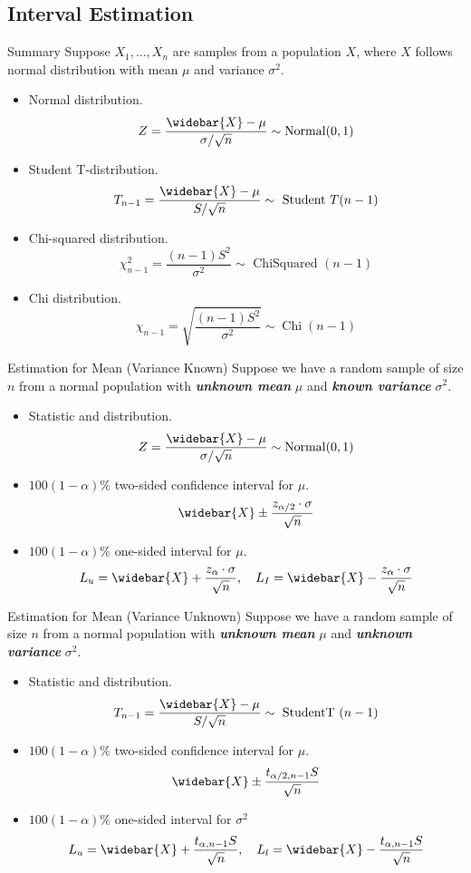 \documentclass{beamer}
\newcommand{\bb}[1]{\textcolor{antiquefuchsia}{\textbf{\textit{#1}}}}
\begin{document}
\subsection{Interval Estimation}
\begin{frame}{Summary}
Suppose $X_{1}, \ldots, X_{n}$ are samples from a population $X$, where $X$ follows normal distribution with mean $\mu$ and variance $\sigma^{2}$.
\begin{itemize}
\item Normal distribution.
$$
Z=\frac{\widebar{X}-\mu}{\sigma / \sqrt{n}} \sim \operatorname{Normal}(0,1)
$$
\item Student T-distribution.
$$
T_{n-1}=\frac{\widebar{X}-\mu}{S / \sqrt{n}} \sim \text { Student } T(n-1)
$$
\item Chi-squared distribution.
$$
\chi_{n-1}^{2}=\frac{(n-1) S^{2}}{\sigma^{2}} \sim \text { ChiSquared }(n-1)
$$
\item Chi distribution.
$$
\chi_{n-1}=\sqrt{\frac{(n-1) S^{2}}{\sigma^{2}}} \sim \operatorname{Chi}(n-1)
$$

\end{itemize}
\end{frame}

\begin{frame}{Estimation for Mean (Variance Known)}
Suppose we have a random sample of size $n$ from a normal population with \bb{unknown mean} $\mu$ and \bb{known variance} $\sigma^{2}$.
\begin{itemize}
\item Statistic and distribution.
$$
Z=\frac{\widebar{X}-\mu}{\sigma / \sqrt{n}} \sim \operatorname{Normal}(0,1)
$$
\item $100(1-\alpha) \%$ two-sided confidence interval for $\mu$.
$$
\widebar{X} \pm \frac{z_{\alpha / 2} \cdot \sigma}{\sqrt{n}}
$$
\item $100(1-\alpha) \%$ one-sided interval for $\mu$.
$$
L_{u}=\widebar{X}+\frac{z_{\alpha} \cdot \sigma}{\sqrt{n}}, \quad L_{I}=\widebar{X}-\frac{z_{\alpha} \cdot \sigma}{\sqrt{n}}
$$
\end{itemize}
\end{frame}

\begin{frame}{Estimation for Mean (Variance Unknown)}
Suppose we have a random sample of size $n$ from a normal population with \bb{unknown mean} $\mu$ and \bb{unknown variance} $\sigma^{2}$.
\begin{itemize}
\item Statistic and distribution.
$$
T_{n-1}=\frac{\widebar{X}-\mu}{S / \sqrt{n}} \sim \text { StudentT }(n-1)
$$
\item $100(1-\alpha) \%$ two-sided confidence interval for $\mu$.
$$
\widebar{X} \pm \frac{t_{\alpha / 2, n-1} S}{\sqrt{n}}
$$
\item $100(1-\alpha) \%$ one-sided interval for $\sigma^{2}$
$$
L_{u}=\widebar{X}+\frac{t_{\alpha, n-1} S}{\sqrt{n}}, \quad L_{l}=\widebar{X}-\frac{t_{\alpha, n-1} S}{\sqrt{n}}
$$
\end{itemize}
\end{frame}
\end{document}
